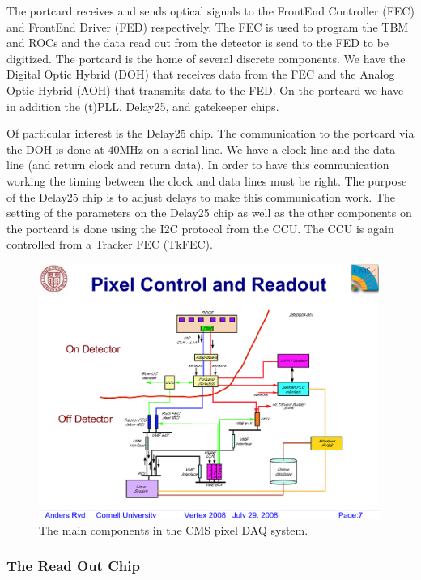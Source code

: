 The portcard receives and sends optical signals to the
FrontEnd Controller (FEC) and FrontEnd Driver (FED)
respectively. The FEC is used to program the TBM 
and ROCs and the data read out from the detector is
send to the FED to be digitized. The portcard is the
home of several discrete components. We have the 
Digital Optic Hybrid (DOH) that receives data from
the FEC and the Analog Optic Hybrid (AOH) that 
transmits data to the FED. On the portcard we
have in addition the (t)PLL, Delay25, and gatekeeper
chips. 

Of particular interest is the Delay25 chip. The communication
to the portcard via the DOH is done at 40MHz on a serial
line. We have a clock line and the data line (and return clock
and return data). In order to have this communication
working the timing between the clock and data lines must
be right. The purpose of the Delay25 chip is to adjust
delays to make this communication work. The setting of the
parameters on the Delay25 chip as well as the other components
on the portcard is done using the I2C protocol from the
CCU. The CCU is again controlled from a Tracker FEC (TkFEC).

\begin{figure}[h]
\begin{center}
 \includegraphics[width=0.99\textwidth]{2860506-001}
\end{center}
\caption{The main components in the CMS pixel DAQ system. }
\label{fig:daqcomponents}
\end{figure}

\clearpage

\subsubsection{The Read Out Chip}

